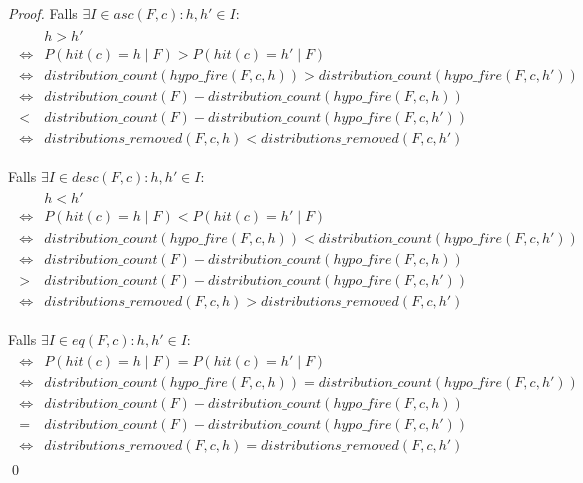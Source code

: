 \documentclass[a4paper,12pt]{llncs}
\numberwithin{equation}{section}
\begin{document}
\begin{proof}

Falls $\exists I \in asc(F, c) \colon h,h' \in I$:
\begin{align}
\begin{split}
&h > h' \\
\Leftrightarrow &P(hit(c)=h \mid F) > P(hit(c)=h' \mid F) \\
\Leftrightarrow &distribution\_count(hypo\_fire(F,c, h)) > distribution\_count(hypo\_fire(F,c, h')) \\
\Leftrightarrow &distribution\_count(F) - distribution\_count(hypo\_fire(F,c, h)) \\
< &distribution\_count(F) - distribution\_count(hypo\_fire(F,c, h')) \\
\Leftrightarrow &distributions\_removed(F,c, h) < distributions\_removed(F,c, h')
\nonumber
\end{split}
\end{align}

Falls $\exists I \in desc(F, c) \colon h,h' \in I$:
\begin{align}
\begin{split}
&h < h' \\
\Leftrightarrow &P(hit(c)=h \mid F) < P(hit(c)=h' \mid F) \\
\Leftrightarrow &distribution\_count(hypo\_fire(F,c, h)) < distribution\_count(hypo\_fire(F,c, h')) \\
\Leftrightarrow &distribution\_count(F) - distribution\_count(hypo\_fire(F,c, h)) \\
> &distribution\_count(F) - distribution\_count(hypo\_fire(F,c, h')) \\
\Leftrightarrow &distributions\_removed(F,c, h) > distributions\_removed(F,c, h')
\nonumber
\end{split}
\end{align}

Falls $\exists I \in eq(F, c) \colon h,h' \in I$:
\begin{align}
\begin{split}
\Leftrightarrow &P(hit(c)=h \mid F) = P(hit(c)=h' \mid F) \\
\Leftrightarrow &distribution\_count(hypo\_fire(F,c, h)) = distribution\_count(hypo\_fire(F,c, h')) \\
\Leftrightarrow &distribution\_count(F) - distribution\_count(hypo\_fire(F,c, h)) \\
= &distribution\_count(F) - distribution\_count(hypo\_fire(F,c, h')) \\
\Leftrightarrow &distributions\_removed(F,c, h) = distributions\_removed(F,c, h')
\nonumber
\end{split}
\end{align}
\qed
\end{proof}
\end{document}
